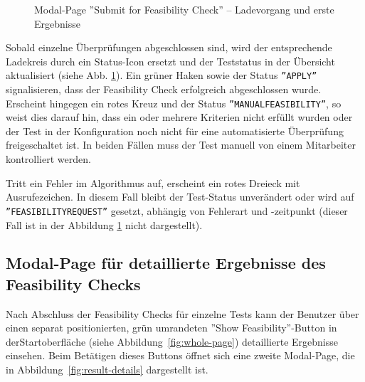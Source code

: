 \begin{figure}[!htbp] 
    \centering 
    \caption{Modal-Page ''Submit for Feasibility Check'' – Ladevorgang und erste Ergebnisse} 
    \label{fig:loading-with-results} 
\end{figure}

Sobald einzelne Überprüfungen abgeschlossen sind, wird der entsprechende Ladekreis durch ein Status-Icon ersetzt und der Teststatus in der Übersicht aktualisiert (siehe Abb. \ref{fig:loading-with-results}). Ein grüner Haken sowie der Status \texttt{''APPLY''} signalisieren, dass der Feasibility Check erfolgreich abgeschlossen wurde. Erscheint hingegen ein rotes Kreuz und der Status \texttt{''MANUALFEASIBILITY''}, so weist dies darauf hin, dass ein oder mehrere Kriterien nicht erfüllt wurden oder der Test in der Konfiguration noch nicht für eine automatisierte Überprüfung freigeschaltet ist. In beiden Fällen muss der Test manuell von einem Mitarbeiter kontrolliert werden.

Tritt ein Fehler im Algorithmus auf, erscheint ein rotes Dreieck mit Ausrufezeichen. In diesem Fall bleibt der Test-Status unverändert oder wird auf \texttt{''FEASIBILITY\-REQUEST''} gesetzt, abhängig von Fehlerart und -zeitpunkt (dieser Fall ist in der Abbildung \ref{fig:loading-with-results} nicht dargestellt).


\subsection{Modal-Page für detaillierte Ergebnisse des Feasibility Checks}

Nach Abschluss der Feasibility Checks für einzelne Tests kann der Benutzer über einen separat positionierten, grün umrandeten ''Show Feasibility''-Button in der\linebreak Startoberfläche (siehe Abbildung~\ref{fig:whole-page}) detaillierte Ergebnisse einsehen. Beim Betätigen dieses Buttons öffnet sich eine zweite Modal-Page, die in Abbildung~\ref{fig:result-details} dargestellt ist.

